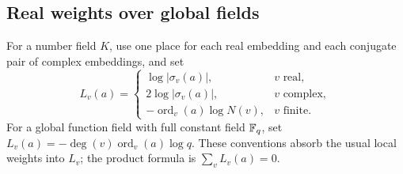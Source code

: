 \subsection{Real weights over global fields}
For a number field $K$, use one place for each real embedding and each
conjugate pair of complex embeddings, and set
\[
 L_v(a)=
 \begin{cases}
  \log|\sigma_v(a)|,&v\text{ real},\\
  2\log|\sigma_v(a)|,&v\text{ complex},\\
  -\operatorname{ord}_v(a)\log N(v),&v\text{ finite}.
 \end{cases}
\]
For a global function field with full constant field $\mathbb F_q$, set
$L_v(a)=-\deg(v)\operatorname{ord}_v(a)\log q$.
These conventions absorb the usual local weights into $L_v$; the product
formula is $\sum_vL_v(a)=0$.

